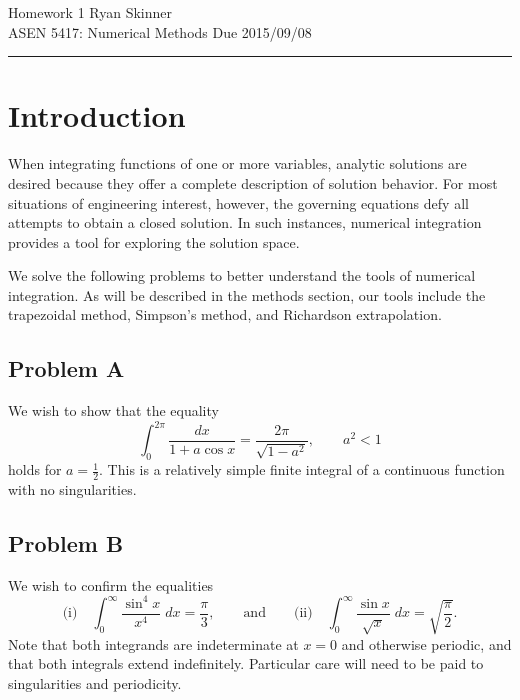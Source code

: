 \documentclass[11pt]{article}
\begin{document}
\pagestyle{fancyplain}
\lhead{}
\chead{}
\rhead{}
\cfoot{\thepage}

\noindent
{\Large Homework 1}
\hfill
{\large Ryan Skinner}
\\[0.5ex]
{\large ASEN 5417: Numerical Methods}
\hfill
{\large Due 2015/09/08}\\
\hrule
\vspace{12pt}

\section{Introduction}

When integrating functions of one or more variables, analytic solutions are desired because they offer a complete description of solution behavior. For most situations of engineering interest, however, the governing equations defy all attempts to obtain a closed solution. In such instances, numerical integration provides a tool for exploring the solution space.

We solve the following problems to better understand the tools of numerical integration. As will be described in the methods section, our tools include the trapezoidal method, Simpson's method, and Richardson extrapolation.

\subsection{Problem A}

We wish to show that the equality
\begin{equation}
\int_{0}^{2\pi} \frac{dx}{1 + a \cos x} = \frac{2\pi}{\sqrt{1-a^2}}, \qquad a^2 < 1
\end{equation}
holds for $a = \tfrac{1}{2}$. This is a relatively simple finite integral of a continuous function with no singularities.

\subsection{Problem B}

We wish to confirm the equalities
\begin{equation}
\text{(i)} \quad
\int_{0}^{\infty} \frac{\sin^4 x}{x^4} \; dx = \frac{\pi}{3}
,
\qquad
\text{and}
\qquad
\text{(ii)} \quad
\int_{0}^{\infty} \frac{\sin x}{\sqrt{x}} \; dx = \sqrt{\frac{\pi}{2}}
.
\end{equation}
Note that both integrands are indeterminate at $x=0$ and otherwise periodic, and that both integrals extend indefinitely. Particular care will need to be paid to singularities and periodicity.
\end{document}

